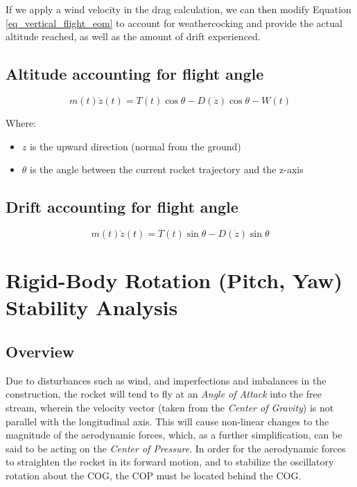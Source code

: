 \documentclass[]{article}
\providecommand{\tightlist}{%
  \setlength{\itemsep}{0pt}\setlength{\parskip}{0pt}}
\begin{document}
If we apply a wind velocity in the drag calculation, we can then modify
Equation \ref{eq_vertical_flight_eom} to account for weathercocking and
provide the actual altitude reached, as well as the amount of drift
experienced.

\subsection{Altitude accounting for flight
angle}\label{altitude-accounting-for-flight-angle}

\begin{equation}
\label{eq_vertical_angle}
m(t)\ddot{z}(t) = T(t) \cos \theta - D(\dot{z}) \cos \theta - W(t)
\end{equation}

Where:

\begin{itemize}
\tightlist
\item
  \(z\) is the upward direction (normal from the ground)
\item
  \(\theta\) is the angle between the current rocket trajectory and the
  z-axis
\end{itemize}

\subsection{Drift accounting for flight
angle}\label{drift-accounting-for-flight-angle}

\begin{equation}
\label{eq_vertical_angle}
m(t) \ddot{z}(t) = T(t) \sin \theta - D(\dot{z}) \sin \theta 
\end{equation}

\section{Rigid-Body Rotation (Pitch, Yaw) Stability
Analysis}\label{rigid-body-rotation-pitch-yaw-stability-analysis}

\subsection{Overview}\label{overview-2}

Due to disturbances such as wind, and imperfections and imbalances in
the construction, the rocket will tend to fly at an \emph{Angle of
Attack} into the free stream, wherein the velocity vector (taken from
the \emph{Center of Gravity}) is not parallel with the longitudinal
axis. This will cause non-linear changes to the magnitude of the
aerodynamic forces, which, as a further simplification, can be said to
be acting on the \emph{Center of Pressure}. In order for the aerodynamic
forces to straighten the rocket in its forward motion, and to stabilize
the oscillatory rotation about the COG, the COP must be located behind
the COG.
\end{document}
